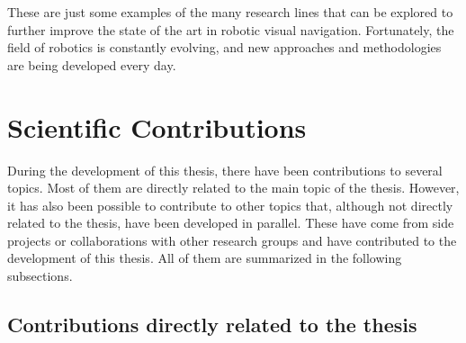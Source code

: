 These are just some examples of the many research lines that can be explored to further improve the state of the art in robotic visual navigation.
Fortunately, the field of robotics is constantly evolving, and new approaches and methodologies are being developed every day.

\section{Scientific Contributions}\label{sec:final-remarks}

During the development of this thesis, there have been contributions to several topics.
Most of them are directly related to the main topic of the thesis.
However, it has also been possible to contribute to other topics that, although not directly related to the thesis, have been developed in parallel.
These have come from side projects or collaborations with other research groups and have contributed to the development of this thesis.
All of them are summarized in the following subsections.

\subsection{Contributions directly related to the thesis}\label{subsec:contributions-directly-related-to-the-thesis}

